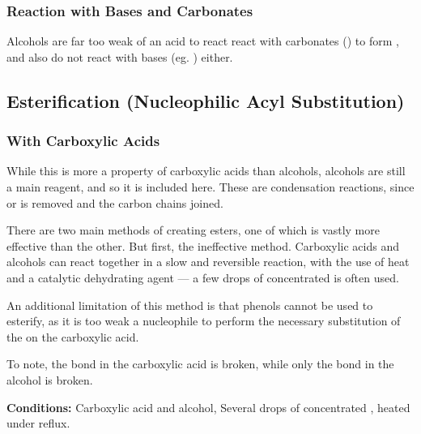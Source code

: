 
			\subsubsection{Reaction with Bases and Carbonates}

				Alcohols are far too weak of an acid to react react with carbonates () to form , and also do not
				react with bases (eg. ) either.



		\subsection{Esterification (Nucleophilic Acyl Substitution)}

			\hypertarget{EsterificationCarboxylicAcids}{}
			\subsubsection{With Carboxylic Acids}

				While this is more a property of carboxylic acids than alcohols, alcohols are still a main reagent, and so it is included here.
				These are condensation reactions, since  or  is removed and the carbon chains joined.

				There are two main methods of creating esters, one of which is vastly more effective than the other. But first, the ineffective
				method. Carboxylic acids and alcohols can react together in a slow and reversible reaction, with the use of heat and a
				catalytic dehydrating agent --- a few drops of concentrated  is often used.


				\pagebreak
				An additional limitation of this method is that phenols cannot be used to esterify, as it is too weak a nucleophile to
				perform the necessary substitution of the  on the carboxylic acid.

				To note, the  bond in the carboxylic acid is broken, while only the  bond in the alcohol is broken.

				\vspace{1.5em}
				\vbox{\textbf{Conditions:}	\tabto{35mm}Carboxylic acid and alcohol,
											\tabto{35mm}Several drops of concentrated , heated under reflux.}

